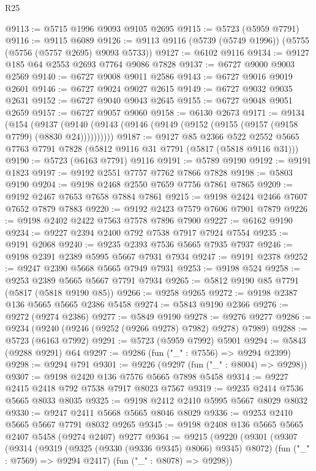 \begin{lexlean}{R25}
\begin{coremodule}
@9113 := @5715 @1996 @9093 @9105 @2695
@9115 := @5723 (@5959 @7791)
@9116 := @9115 @6089
@9126 := @9113 @9116 (@5739 (@5749 @1996)) (@5755 (@5756 (@5757 @2695) @9093 @5733))
@9127 := @6102 @9116
@9134 := @9127 @185 @64 @2553 @2693 @7764 @9086 @7828
@9137 := @6727 @9000 @9003 @2569
@9140 := @6727 @9008 @9011 @2586
@9143 := @6727 @9016 @9019 @2601
@9146 := @6727 @9024 @9027 @2615
@9149 := @6727 @9032 @9035 @2631
@9152 := @6727 @9040 @9043 @2645
@9155 := @6727 @9048 @9051 @2659
@9157 := @6727 @9057 @9060
@9158 := @6130 @2673
@9171 := @9134
    (@154 (@9137 (@9140 (@9143 (@9146 (@9149 (@9152 (@9155 (@9157 (@9158 @7799) (@8830 @24))))))))))
@9187 := @9127
    @85
    @2366
    @522
    @2552
    @5665
    @7763
    @7791
    @7828
    (@5812 @9116 @31 @7791 (@5817 (@5818 @9116 @31)))
@9190 := @5723 (@6163 @7791) @9116
@9191 := @5789 @9190
@9192 := @9191 @1823
@9197 := @9192 @2551 @7757 @7762 @7866 @7828
@9198 := @5803 @9190
@9204 := @9198 @2468 @2550 @7659 @7756 @7861 @7865
@9209 := @9192 @2467 @7653 @7658 @7884 @7861
@9215 := @9198 @2424 @2466 @7607 @7652 @7879 @7883
@9220 := @9192 @2423 @7579 @7606 @7901 @7879
@9226 := @9198 @2402 @2422 @7563 @7578 @7896 @7900
@9227 := @6162 @9190
@9234 := @9227 @2394 @2400 @792 @7538 @7917 @7924 @7554
@9235 := @9191 @2068
@9240 := @9235 @2393 @7536 @5665 @7935 @7937
@9246 := @9198 @2391 @2389 @5995 @5667 @7931 @7934
@9247 := @9191 @2378
@9252 := @9247 @2390 @5668 @5665 @7949 @7931
@9253 := @9198 @524
@9258 := @9253 @2389 @5665 @5667 @7791 @7934
@9265 := @5812 @9190 @85 @7791 (@5817 (@5818 @9190 @85))
@9266 := @9258 @9265
@9272 := @9198 @2387 @136 @5665 @5665 @2386 @5458
@9274 := @5843 @9190 @2366
@9276 := @9272 (@9274 @2386)
@9277 := @5849 @9190
@9278 := @9276 @9277
@9286 := @9234 (@9240 (@9246 (@9252 (@9266 @9278) @7982) @9278) @7989)
@9288 := @5723 (@6163 @7992)
@9291 := @5723 (@5959 @7992) @5901
@9294 := @5843 (@9288 @9291) @64
@9297 := @9286 (fun ("_" : @7556) => @9294 @2399)
@9298 := @9294 @791
@9301 := @9226 (@9297 (fun ("_" : @8004) => @9298))
@9307 := @9198 @2420 @136 @7576 @5665 @7898 @5458
@9314 := @9227 @2415 @2418 @792 @7538 @7917 @8023 @7567
@9319 := @9235 @2414 @7536 @5665 @8033 @8035
@9325 := @9198 @2412 @2410 @5995 @5667 @8029 @8032
@9330 := @9247 @2411 @5668 @5665 @8046 @8029
@9336 := @9253 @2410 @5665 @5667 @7791 @8032 @9265
@9345 := @9198 @2408 @136 @5665 @5665 @2407 @5458 (@9274 @2407) @9277
@9364 := @9215
    (@9220
      (@9301
        (@9307
          (@9314
            (@9319 (@9325 (@9330 (@9336 @9345) @8066) @9345) @8072)
            (fun ("_" : @7569) => @9294 @2417)
            (fun ("_" : @8078) => @9298))

\end{coremodule}
\end{lexlean}
